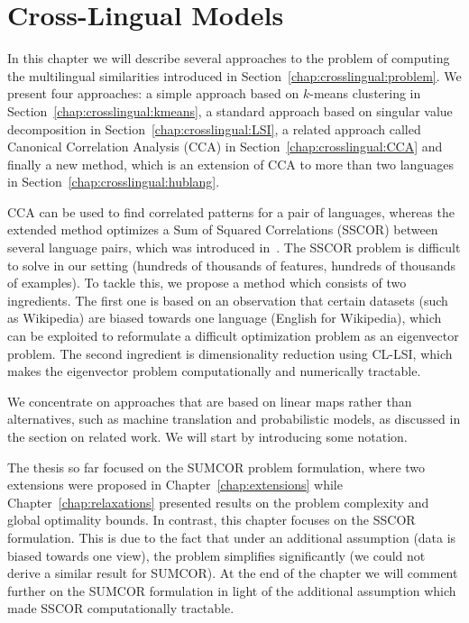 \section{Cross-Lingual Models}\label{chap:crosslingual:models}
In this chapter we will describe several approaches to the problem of computing the
multilingual similarities introduced in Section~\ref{chap:crosslingual:problem}. We present four approaches:
a simple approach based on $k$-means clustering in Section~\ref{chap:crosslingual:kmeans}, a standard approach
based on singular value decomposition in Section~\ref{chap:crosslingual:LSI}, a related
approach called Canonical Correlation Analysis (CCA) in Section~\ref{chap:crosslingual:CCA} and finally a
new method, which is an extension of CCA to more than two languages in Section~\ref{chap:crosslingual:hublang}.

CCA can be used to find correlated patterns for a pair of languages, whereas the extended method
optimizes a Sum of Squared Correlations (SSCOR) between several language pairs, which was introduced
in~\cite{Kettenring}. The SSCOR problem is difficult to solve in our setting (hundreds of thousands
of features, hundreds of thousands of examples). To tackle this, we propose a method which consists
of two ingredients. The first one is based on an observation that certain datasets (such as Wikipedia)
are biased towards one language (English for Wikipedia), which can be exploited to reformulate a
difficult optimization problem as an eigenvector problem. The second ingredient is dimensionality
reduction using CL-LSI, which makes the eigenvector problem computationally and numerically tractable.

We concentrate on approaches that are based on linear maps rather than alternatives, such as machine
translation and probabilistic models, as discussed in the section on related work. We will start
by introducing some notation.

The thesis so far focused on the SUMCOR problem formulation, where two extensions were proposed in Chapter~\ref{chap:extensions} while
Chapter~\ref{chap:relaxations} presented results on the problem complexity and global optimality bounds. In contrast, this chapter focuses
on the SSCOR formulation. This is due to the fact that under an additional assumption (data is biased towards one view),
the problem simplifies significantly (we could not derive a similar result for SUMCOR). At the end of the chapter we will comment further
on the SUMCOR formulation in light of the additional assumption which made SSCOR computationally tractable.

